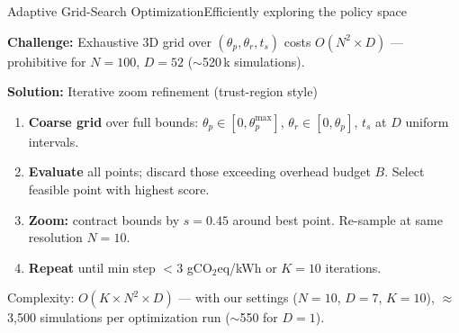 \begin{frame}[t]{Adaptive Grid-Search Optimization}{Efficiently
  exploring the policy space}

  \textbf{Challenge:} Exhaustive 3D grid over $(\theta_p, \theta_r,
  t_s)$ costs $O(N^2 \times D)$ ---
  prohibitive for $N=100$, $D=52$ ($\sim$520\,k simulations).

  \vspace{0.3cm}
  \textbf{Solution:} Iterative zoom refinement (trust-region style)\\
  \begin{enumerate}
    \item \textbf{Coarse grid} over full bounds: $\theta_p \in [0,
      \theta_p^{\max}]$,
      $\theta_r \in [0, \theta_p]$, $t_s$ at $D$ uniform intervals.
    \item \textbf{Evaluate} all points; discard those exceeding
      overhead budget $B$.
      Select feasible point with highest score.
    \item \textbf{Zoom:} contract bounds by $s = 0.45$ around best point.
      Re-sample at same resolution $N=10$.
    \item \textbf{Repeat} until min step $< 3$ gCO$_2$eq/kWh or
      $K=10$ iterations.
  \end{enumerate}

  \vspace{0.2cm}
  Complexity: $O(K \times N^2 \times D)$ --- with our settings
  ($N=10$, $D=7$, $K=10$),
  $\approx$ 3,500 simulations per optimization run ($\sim$550 for $D=1$).

\end{frame}
